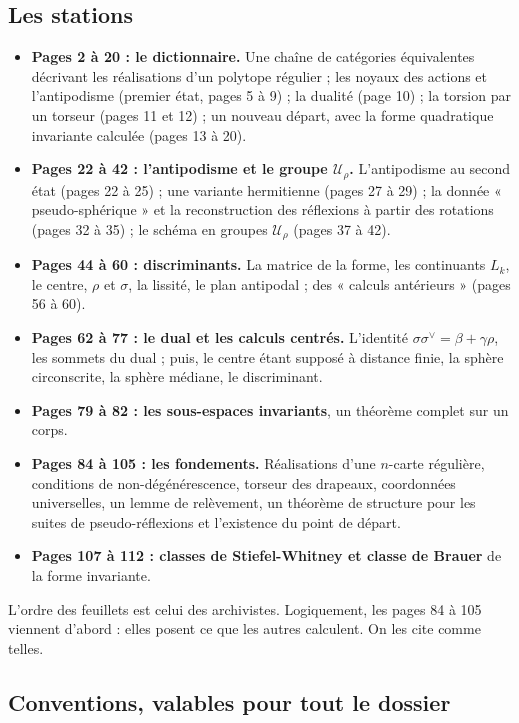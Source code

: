 \documentclass[11pt,a4paper]{article}
\begin{document}
\subsection*{Les stations}

\begin{itemize}
  \item \textbf{Pages 2 à 20 : le dictionnaire.} Une chaîne de catégories
    équivalentes décrivant les réalisations d'un polytope régulier ; les
    noyaux des actions et l'antipodisme (premier état, pages 5 à 9) ; la
    dualité (page 10) ; la torsion par un torseur (pages 11 et 12) ; un
    nouveau départ, avec la forme quadratique invariante calculée (pages 13 à
    20).
  \item \textbf{Pages 22 à 42 : l'antipodisme et le groupe $\mathcal{U}_\rho$.}
    L'antipodisme au second état (pages 22 à 25) ; une variante hermitienne
    (pages 27 à 29) ; la donnée « pseudo-sphérique » et la reconstruction des
    réflexions à partir des rotations (pages 32 à 35) ; le schéma en groupes
    $\mathcal{U}_\rho$ (pages 37 à 42).
  \item \textbf{Pages 44 à 60 : discriminants.} La matrice de la forme, les
    continuants $L_k$, le centre, $\rho$ et $\sigma$, la lissité, le plan
    antipodal ; des « calculs antérieurs » (pages 56 à 60).
  \item \textbf{Pages 62 à 77 : le dual et les calculs centrés.} L'identité
    $\sigma\sigma^\vee = \beta + \gamma\rho$, les sommets du dual ; puis, le
    centre étant supposé à distance finie, la sphère circonscrite, la sphère
    médiane, le discriminant.
  \item \textbf{Pages 79 à 82 : les sous-espaces invariants}, un théorème
    complet sur un corps.
  \item \textbf{Pages 84 à 105 : les fondements.} Réalisations d'une $n$-carte
    régulière, conditions de non-dégénérescence, torseur des drapeaux,
    coordonnées universelles, un lemme de relèvement, un théorème de structure
    pour les suites de pseudo-réflexions et l'existence du point de départ.
  \item \textbf{Pages 107 à 112 : classes de Stiefel-Whitney et classe de
    Brauer} de la forme invariante.
\end{itemize}

L'ordre des feuillets est celui des archivistes. Logiquement, les pages 84 à
105 viennent d'abord : elles posent ce que les autres calculent. On les cite
comme telles.

\subsection*{Conventions, valables pour tout le dossier}
\end{document}
